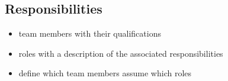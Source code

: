\subsection{Responsibilities}

\begin{itemize}
    \item team members with their qualifications
    \item roles with a description of the associated responsibilities
    \item define which team members assume which roles
\end{itemize}
